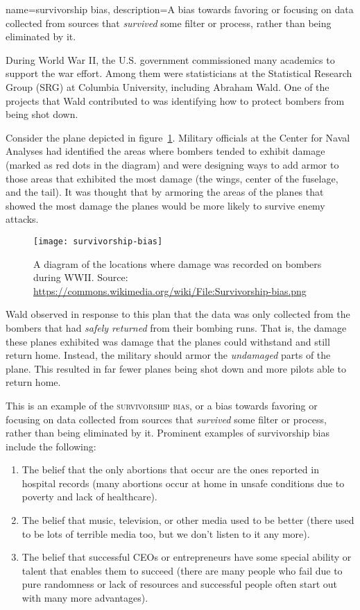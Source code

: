 {
name=survivorship bias,
description={A bias towards favoring or focusing on data collected from sources that \emph{survived} some filter or process, rather than being eliminated by it.}
}

During World War II, the U.S. government commissioned many academics to support the war effort. Among them were statisticians at the Statistical Research Group (SRG) at Columbia University, including Abraham Wald. One of the projects that Wald contributed to was identifying how to protect bombers from being shot down.

Consider the plane depicted in figure~\ref{fig:survivorplane}. Military officials at the Center for Naval Analyses had identified the areas where bombers tended to exhibit damage (marked as red dots in the diagram) and were designing ways to add armor to those areas that exhibited the most damage (the wings, center of the fuselage, and the tail). It was thought that by armoring the areas of the planes that showed the most damage the planes would be more likely to survive enemy attacks.

\begin{figure}[!ht]
\texttt{[image: survivorship-bias]}
\caption{A diagram of the locations where damage was recorded on bombers during WWII. Source: \url{https://commons.wikimedia.org/wiki/File:Survivorship-bias.png}}
\label{fig:survivorplane}
\end{figure}

Wald observed in response to this plan that the data was only collected from the bombers that had \emph{safely returned} from their bombing runs. That is, the damage these planes exhibited was damage that the planes could withstand and still return home. Instead, the military should armor the \emph{undamaged} parts of the plane. This resulted in far fewer planes being shot down and more pilots able to return home.

This is an example of the \textsc{\gls{survivorship bias}}, or a bias towards favoring or focusing on data collected from sources that \emph{survived} some filter or process, rather than being eliminated by it. Prominent examples of survivorship bias include the following:

\begin{enumerate}
\item The belief that the only abortions that occur are the ones reported in hospital records (many abortions occur at home in unsafe conditions due to poverty and lack of healthcare).
\item The belief that music, television, or other media used to be better (there used to be lots of terrible media too, but we don't listen to it any more).
\item The belief that successful CEOs or entrepreneurs have some special ability or talent that enables them to succeed (there are many people who fail due to pure randomness or lack of resources and successful people often start out with many more advantages).
\end{enumerate}

